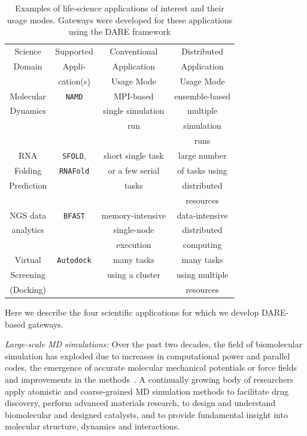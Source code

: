 \documentclass[]{article}
\begin{document}
\begin{table}
 \small
\begin{tabular}{|c|c|c|c|} 
  \hline Science  & Supported  & Conventional   &   Distributed
  \\
  Domain & Appli- & Application & Application \\ 
  &  cation(s) & Usage Mode & Usage Mode \\  \hline \hline 
  
  Molecular   &  \texttt{NAMD} &  MPI-based  & ensemble-based   \\
  Dynamics  &  & single simulation  & multiple  \\ 
  &  & run &  simulation  \\ 
  &  &  &  runs \\ \hline
  RNA   & \texttt{SFOLD}, & short single task    & large number  \\
  Folding   & \texttt{RNAFold} & or a few serial & of tasks using   \\
  Prediction & &  tasks &distributed \\
  &  &  &   resources  \\ \hline
  NGS data     &  \texttt{BFAST} & memory-intensive  & data-intensive\\ 
  analytics  &  &  single-node   &  distributed  \\
  & & execution  & computing \\ \hline
  Virtual  & \texttt{Autodock} &  many tasks   & many tasks \\
  Screening  &  & using a cluster  & using multiple  \\
  (Docking) &  &  & resources \\ \hline
  \hline
\end{tabular} \caption{Examples of life-science applications of interest and their usage modes.   Gateways were developed for these applications using the DARE framework}
 \label{table:four-applications} 
\end{table}

Here we describe the four scientific applications for which we develop
DARE-based gateways.

\textit{Large-scale MD simulations:} Over the past two
decades, the field of biomolecular simulation has exploded due to
increases in computational power and parallel codes, the emergence of
accurate molecular mechanical potentials or force fields and
improvements in the methods~\cite{adcock2006}. 
A continually growing body of researchers apply atomistic and
coarse-grained MD simulation methods to facilitate drug discovery,
perform advanced materials research, to design and understand
biomolecular and designed catalysts, and to provide fundamental
insight into molecular structure, dynamics and interactions.
\end{document}
